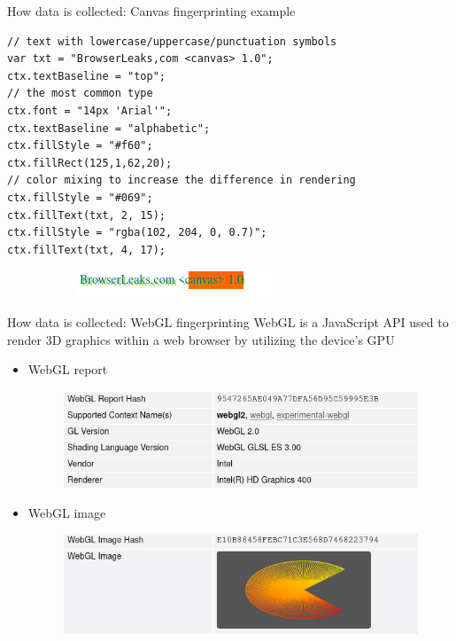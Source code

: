\begin{frame}[fragile]{How data is collected: Canvas fingerprinting example}
  \begin{verbatim}
// text with lowercase/uppercase/punctuation symbols
var txt = "BrowserLeaks,com <canvas> 1.0";
ctx.textBaseline = "top";
// the most common type
ctx.font = "14px 'Arial'";
ctx.textBaseline = "alphabetic";
ctx.fillStyle = "#f60";
ctx.fillRect(125,1,62,20);
// color mixing to increase the difference in rendering
ctx.fillStyle = "#069";
ctx.fillText(txt, 2, 15);
ctx.fillStyle = "rgba(102, 204, 0, 0.7)";
ctx.fillText(txt, 4, 17);
  \end{verbatim}

  \begin{figure}
    \centering
    \begin{subfigure}{0.45\textwidth}
      \includegraphics[width=\linewidth]{images/canvas.png}
    \end{subfigure}
    \begin{subfigure}{0.45\textwidth}
    \end{subfigure}
  \end{figure}
\end{frame}

\begin{frame}{How data is collected: WebGL fingerprinting}
  WebGL is a JavaScript API used to render 3D graphics within a web browser by utilizing the device's GPU
  \begin{itemize}
    \item WebGL report
          \begin{figure}
            \centering
            \includegraphics[width=\linewidth, scale=0.8]{images/webgl-report.png}
          \end{figure}
    \item WebGL image
          \begin{figure}
            \centering
            \includegraphics[width=\linewidth, scale=0.8]{images/webgl-image.png}
          \end{figure}
  \end{itemize}
\end{frame}
